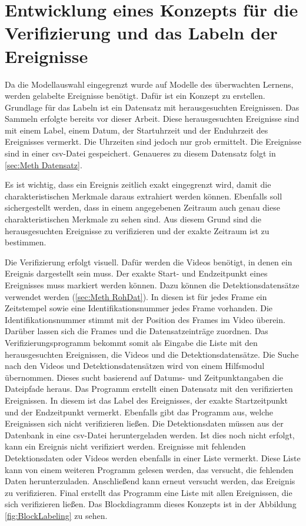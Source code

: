 \section{Entwicklung eines Konzepts für die Verifizierung und das Labeln der Ereignisse} \label{sec:Meth Labeling}
Da die Modellauswahl eingegrenzt wurde auf Modelle des überwachten Lernens, werden gelabelte Ereignisse benötigt. Dafür ist ein Konzept zu erstellen. Grundlage für das Labeln ist ein Datensatz mit herausgesuchten Ereignissen. Das Sammeln erfolgte bereits vor dieser Arbeit. Diese herausgesuchten Ereignisse sind mit einem Label, einem Datum, der Startuhrzeit und der Enduhrzeit des Ereignisses vermerkt. Die Uhrzeiten sind jedoch nur grob ermittelt. Die Ereignisse sind in einer csv-Datei gespeichert. Genaueres zu diesem Datensatz folgt in  \autoref{sec:Meth Datensatz}. \par

Es ist wichtig, dass ein Ereignis zeitlich exakt eingegrenzt wird, damit die charakteristischen Merkmale daraus extrahiert werden können. Ebenfalls soll sichergestellt werden, dass in einem angegebenen Zeitraum auch genau diese charakteristischen Merkmale zu sehen sind. Aus diesem Grund sind die herausgesuchten Ereignisse zu verifizieren und der exakte Zeitraum ist zu bestimmen. \par 

Die Verifizierung erfolgt visuell. Dafür werden die Videos benötigt, in denen ein Ereignis dargestellt sein muss. Der exakte Start- und Endzeitpunkt eines Ereignisses muss markiert werden können. Dazu können die Detektionsdatensätze verwendet werden (\autoref{sec:Meth RohDat}). In diesen ist für jedes Frame ein Zeitstempel sowie eine Identifikationsnummer jedes Frame vorhanden. Die Identifikationsnummer stimmt mit der Position des Frames im Video überein. Darüber lassen sich die Frames und die Datensatzeinträge zuordnen. Das Verifizierungsprogramm bekommt somit als Eingabe die Liste mit den herausgesuchten Ereignissen, die Videos und die  Detektionsdatensätze. Die Suche nach den Videos und Detektionsdatensätzen wird von einem Hilfsmodul übernommen. Dieses sucht basierend auf Datums- und Zeitpunktangaben die Dateipfade heraus. Das Programm erstellt einen Datensatz mit den verifizierten Ereignissen. In diesem ist das Label des Ereignisses, der exakte Startzeitpunkt und der Endzeitpunkt vermerkt. Ebenfalls gibt das Programm aus, welche Ereignissen sich nicht verifizieren ließen. Die Detektionsdaten müssen aus der Datenbank in eine csv-Datei heruntergeladen werden. Ist dies noch nicht erfolgt, kann ein Ereignis nicht verifiziert werden. Ereignisse mit fehlenden Detektionsdaten oder Videos werden ebenfalls in einer Liste vermerkt. Diese Liste kann von einem weiteren Programm gelesen werden, das versucht, die fehlenden Daten herunterzuladen. Anschließend kann erneut versucht werden, das Ereignis zu verifizieren. Final erstellt das Programm eine Liste mit allen Ereignissen, die sich verifizieren ließen. Das Blockdiagramm dieses Konzepts ist in der Abbildung \ref{fig:BlockLabeling} zu sehen. 

